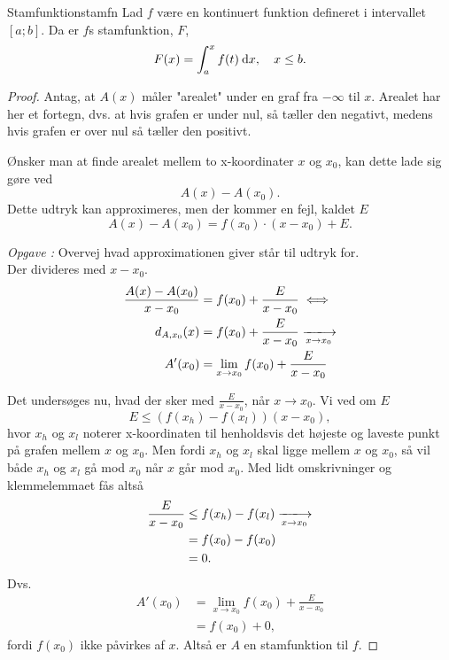 \documentclass{article}
\newcounter{opgavecnt}
\newcommand{\opg}[1]{\stepcounter{opgavecnt}\textit{Opgave \arabic{opgavecnt}: }#1}
\begin{document}
\begin{theorem}{Stamfunktion}{stamfn}
    Lad $f$ være en kontinuert funktion defineret i intervallet $[a; b]$. Da er
    $f$s stamfunktion, $F$,
    \[
        F(x) = \int_a^x f(t) \:\mathrm{d}x,\quad x \leq b.        
    \] 
\end{theorem}

\begin{proof}
Antag, at $A(x)$ måler "arealet" under en graf fra $-\infty$ til $x$. Arealet
har her et fortegn, dvs. at hvis grafen er under nul, så tæller den negativt,
medens hvis grafen er over nul så tæller den positivt.

Ønsker man at finde arealet mellem to x-koordinater $x$ og $x_0$, kan dette
lade sig gøre ved
\[
    A(x) - A(x_0).
\] 
Dette udtryk kan approximeres, men der kommer en fejl, kaldet $E$
\[
    A(x) - A(x_0) = f(x_0) \cdot (x-x_0) + E.
\] 

\opg{Overvej hvad approximationen giver står til udtryk for.}\\
Der divideres med $x-x_0$.
\begin{align*}
    \frac{A(x)-A(x_0)}{x-x_0} &= f(x_0) + \frac{E}{x-x_0}\iff\\
    \sek{A}{x_0}(x) &= f(x_0) + \frac{E}{x-x_0} \xlongrightarrow[x \to x_0]{}\\
    A'(x_0) &= \lim_{x \to x_0} f(x_0) + \frac{E}{x-x_0}
\end{align*}

Det undersøges nu, hvad der sker med $\frac{E}{x-x_0}$, når $x \to x_0$.
Vi ved om $E$
\[
    E \le (f(x_h) - f(x_l))(x-x_0),
\] 
hvor $x_h$ og $x_l$ noterer x-koordinaten til henholdsvis det højeste og
laveste punkt på grafen mellem $x$ og $x_0$. Men fordi $x_h$ og $x_l$ skal
ligge mellem $x$ og $x_0$, så vil både $x_h$ og $x_l$ gå mod $x_0$ når $x$ går
mod $x_0$. Med lidt omskrivninger og klemmelemmaet fås altså
\begin{align*}
    \frac{E}{x-x_0} &\le f(x_h) - f(x_l) \xlongrightarrow[x \to x_0]{}\\
                    &= f(x_0) - f(x_0)\\
                    &= 0.
\end{align*}
Dvs.
\begin{align*}
    A'(x_0) &= \lim_{x \to x_0} f(x_0) + \frac{E}{x-x_0}\\
           &= f(x_0) + 0,
\end{align*}
fordi $f(x_0)$ ikke påvirkes af $x$. Altså er $A$ en stamfunktion til $f$.
\end{proof}
\end{document}
